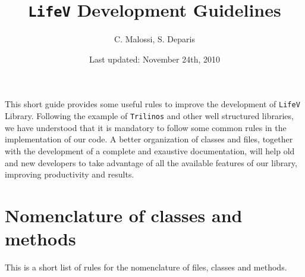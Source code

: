 \documentclass[10p]{article}
\title{\texttt{LifeV} Development Guidelines}
\author{C. Malossi, S. Deparis}
\date{Last updated: November 24th, 2010}
\begin{document}
\maketitle

This short guide provides some useful rules to improve the development of \texttt{LifeV} Library. Following the example of \texttt{Trilinos} and other well structured libraries, we have understood that it is mandatory to follow some common rules in the implementation of our code. A better organization of classes and files, together with the development of a complete and exaustive documentation, will help old and new developers to take advantage of all the available features of our library, improving productivity and results.

\section{Nomenclature of classes and methods}
This is a short list of rules for the nomenclature of files, classes and methods.
\end{document}
